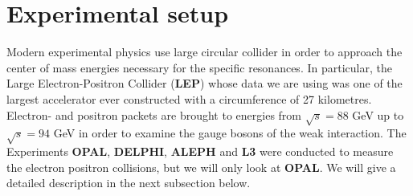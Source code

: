 \section{Experimental setup}
\label{sec:experimentalsetup}
Modern experimental physics use large circular collider in order to approach the center of mass energies necessary for the
specific resonances. In particular, the Large Electron-Positron Collider (\textbf{LEP}) whose data we are using was one
of the largest accelerator ever constructed with a circumference of 27 kilometres. Electron- and positron packets are brought
to energies from $\sqrt{s} = 88$ GeV up to $\sqrt{s} = 94$ GeV in order to examine the gauge bosons of the weak interaction. 
The Experiments \textbf{OPAL}, \textbf{DELPHI}, \textbf{ALEPH} and \textbf{L3} were conducted to measure the electron positron
collisions, but we will only look at \textbf{OPAL}. 
We will give a detailed description in the next
subsection below.


